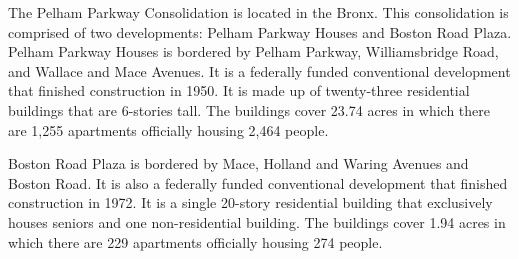 The Pelham Parkway Consolidation is located in the Bronx. This consolidation is comprised of two developments: Pelham Parkway Houses and Boston Road Plaza. Pelham Parkway Houses is bordered by Pelham Parkway, Williamsbridge Road, and Wallace and Mace Avenues. It is a federally funded conventional development that finished construction in 1950. It is made up of twenty-three residential buildings that are 6-stories tall. The buildings cover 23.74 acres in which there are 1,255 apartments officially housing 2,464 people.   \par \vspace{.7\baselineskip}  \par \vspace{.7\baselineskip}Boston Road Plaza is bordered by Mace, Holland and Waring Avenues and Boston Road. It is also a federally funded conventional development that finished construction in 1972. It is a single 20-story residential building that exclusively houses seniors and one non-residential building. The buildings cover 1.94 acres in which there are 229 apartments officially housing 274 people.